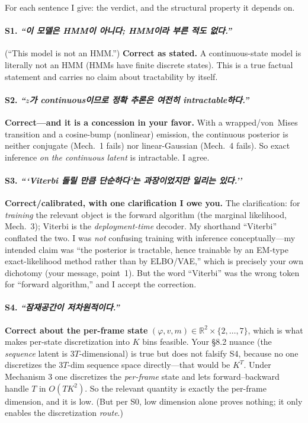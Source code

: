 \documentclass[11pt]{article}
\newcommand{\korean}[1]{\textit{#1}}
\begin{document}
For each sentence I give: the verdict, and the structural property it depends on.

\paragraph{S1. \korean{``이 모델은 HMM이 아니다; HMM이라 부른 적도 없다.''}}
(``This model is not an HMM.'') \textbf{Correct as stated.} A continuous-state model is literally not
an HMM (HMMs have finite discrete states). This is a true factual statement and carries no claim
about tractability by itself.

\paragraph{S2. \korean{``$z$가 continuous이므로 정확 추론은 여전히 intractable하다.''}}
\textbf{Correct---and it is a concession in your favor.} With a wrapped/von~Mises transition and a
cosine-bump (nonlinear) emission, the continuous posterior is neither conjugate (Mech.~1 fails) nor
linear-Gaussian (Mech.~4 fails). So exact inference \emph{on the continuous latent} is intractable.
I agree.

\paragraph{S3. \korean{```Viterbi 돌릴 만큼 단순하다'는 과장이었지만 일리는 있다.''}}
\textbf{Correct/calibrated, with one clarification I owe you.} The clarification: for \emph{training}
the relevant object is the forward algorithm (the marginal likelihood, Mech.~3); Viterbi is the
\emph{deployment-time} decoder. My shorthand ``Viterbi'' conflated the two. I was \emph{not}
confusing training with inference conceptually---my intended claim was ``the posterior is tractable,
hence trainable by an EM-type exact-likelihood method rather than by ELBO/VAE,'' which is precisely
your own dichotomy (your message, point~1). But the word ``Viterbi'' was the wrong token for
``forward algorithm,'' and I accept the correction.

\paragraph{S4. \korean{``잠재공간이 저차원적이다.''}}
\textbf{Correct about the per-frame state} $(\varphi,v,m)\in\mathbb{R}^2\times\{2,\dots,7\}$, which is
what makes per-state discretization into $K$ bins feasible. Your \S8.2 nuance (the \emph{sequence}
latent is $3T$-dimensional) is true but does not falsify S4, because no one discretizes the $3T$-dim
sequence space directly---that would be $K^T$. Under Mechanism 3 one discretizes the \emph{per-frame}
state and lets forward--backward handle $T$ in $O(TK^2)$. So the relevant quantity is exactly the
per-frame dimension, and it is low. (But per S0, low dimension alone proves nothing; it only enables
the discretization \emph{route}.)
\end{document}

